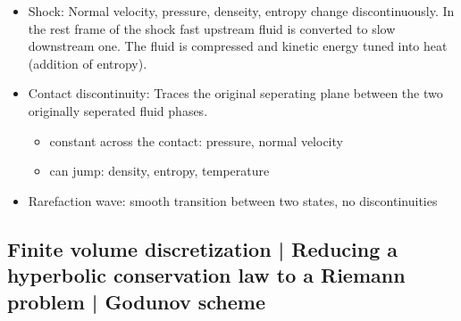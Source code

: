 
\begin{itemize}
    \item \textcolor{blue1}{Shock:} Normal velocity, pressure, denseity, entropy change discontinuously. In the rest frame of the shock fast upstream fluid is converted to slow downstream one. The fluid is compressed and kinetic energy tuned into heat (addition of entropy).
    \item \textcolor{blue1}{Contact discontinuity:} Traces the original seperating plane between the two originally seperated fluid phases.
    \begin{itemize}
        \item \textcolor{blue1}{constant across the contact:} pressure, normal velocity
        \item \textcolor{blue1}{can jump:} density, entropy, temperature
    \end{itemize}
    \item \textcolor{blue1}{Rarefaction wave:} smooth transition between two states, no discontinuities
\end{itemize}

\subsection{Finite volume discretization | Reducing a hyperbolic conservation law to a Riemann problem | Godunov scheme}

